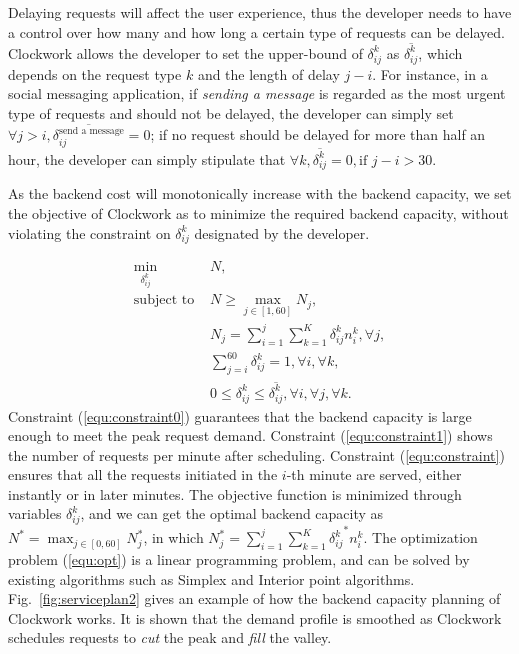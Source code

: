 Delaying requests will affect the user experience, thus the developer needs to have a control over how many and how long a certain type of requests can be delayed. Clockwork allows the developer to set the upper-bound of $\delta_{ij}^k$ as $\overline{\delta_{ij}^k}$, which depends on the request  type $k$ and the length of delay $j-i$. For instance, in a social messaging application, if  \emph{sending a message} is regarded as the most urgent type of requests and should not be delayed, the developer can simply set $\forall j > i,\overline{\delta_{ij}^{\textrm{send a message}}} = 0$; if no request should be delayed for more than half an hour, the developer can simply stipulate that $\forall k,\overline{\delta_{ij}^{k}} = 0, \textrm{if } j - i > 30$.     

As the backend cost will monotonically increase with the backend capacity, we set the objective of Clockwork as to minimize the required backend capacity, without violating the constraint on $\delta_{ij}^k$ designated by the developer.

\begin{align}\label{equ:opt}
\min\limits_{\delta_{ij}^k}~ & N, \\
\textrm{subject to } & N \ge \max\limits_{j\in[1,60]}N_j, \label{equ:constraint0}\\
& N_j = \sum_{i=1}^{j}\sum_{k=1}^K\delta_{ij}^k n_i^k, \forall j,\label{equ:constraint1}\\
&\sum\limits_{j = i}^{60} \delta_{ij}^k = 1, \forall i, \forall k,\label{equ:constraint}\\
& 0\le \delta_{ij}^k \le \overline{\delta_{ij}^k}, \forall i, \forall j, \forall k.
\end{align}
Constraint (\ref{equ:constraint0}) guarantees that the backend capacity is large enough to meet the peak request demand. Constraint (\ref{equ:constraint1}) shows the number of requests per minute after scheduling. Constraint (\ref{equ:constraint}) ensures that all the requests initiated in the $i$-th minute are served, either instantly or in later minutes. The objective function is minimized through variables $\delta_{ij}^{k}$, and we can get the optimal backend capacity as $N^*  = \max_{j\in[0,60]}N_j^*$, in which $N_j^* = \sum_{i=1}^{j}\sum_{k=1}^K{\delta_{ij}^k}^* n_i^k$. The optimization problem (\ref{equ:opt}) is a linear programming problem, and can be solved by existing algorithms such as Simplex and Interior point algorithms. Fig.~\ref{fig:serviceplan2} gives an example of how the backend capacity planning of Clockwork works. It is shown that the demand profile is smoothed as Clockwork schedules requests to \emph{cut} the peak and \emph{fill} the valley.   



